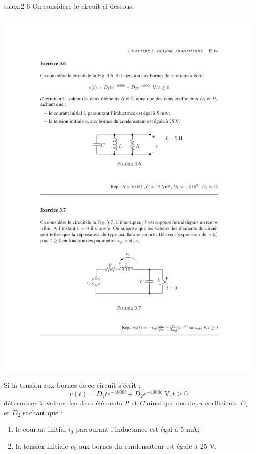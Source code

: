 \begin{exwithsol}{solex:2-6}
	\label{ex:2-6}
On consid\`ere le circuit ci-dessous.
\begin{center}
	\includegraphics[width=0.6\linewidth]{exercices/ex-3-6}
\end{center} 
Si la tension aux bornes de ce circuit s'\'ecrit :
\[v(t)=D_1te^{-4000t}+D_2e^{-4000t}\,\, \mbox{V}, t\geq 0\]
d\'eterminer la valeur des deux \'el\'ements $R$ et $C$ ainsi que des deux
coefficients $D_1$ et $D_2$ sachant que :
\begin{enumerate}
	\item le courant initial $i_0$ parcourant l'inductance est \'egal \`a 5 mA;
	\item la tension initiale $v_0$ aux bornes du condensateur est \'egale \`a 25 V.
\end{enumerate}
\end{exwithsol}

